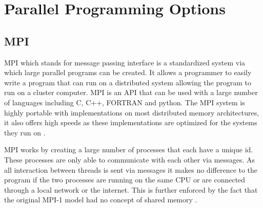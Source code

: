 \section*{Parallel Programming Options}

\subsection*{MPI}
MPI which stands for message passing interface is a standardized system via which large parallel programs can be created. It allows a programmer to easily write a program that can run on a distributed system allowing the program to run on a cluster computer. MPI is an API that can be used with a large number of languages including C, C++, FORTRAN and python. The MPI system is highly portable with implementations on most distributed memory architectures, it also offers high speeds as these implementations are optimized for the systems they run on \cite{mpi}.

MPI works by creating a large number of processes that each have a unique id. These processes are only able to communicate with each other via messages. As all interaction between threads is sent via messages it makes no difference to the program if the two processes are running on the same CPU or are connected through a local network or the internet. This is further enforced by the fact that the original MPI-1 model had no concept of shared memory \cite{mpi}.